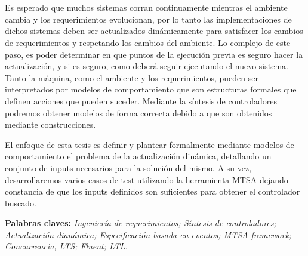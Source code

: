 \chapter*{\runtitulo}

\noindent Es esperado que muchos sistemas corran continuamente mientras el ambiente cambia y los
requerimientos evolucionan, por lo tanto las implementaciones de dichos sistemas deben ser
actualizados dinámicamente para satisfacer los cambios de requerimientos y respetando los cambios
del ambiente. Lo complejo de este paso, es poder determinar en que puntos de la ejecución previa
es seguro hacer la actualización, y si es seguro, como deberá seguir ejecutando el nuevo sistema.
Tanto la máquina, como el ambiente y los requerimientos, pueden ser interpretados por modelos de 
comportamiento que son estructuras formales que definen acciones que pueden suceder. Mediante la
síntesis de controladores podremos obtener modelos de forma correcta debido a que son obtenidos 
mediante construcciones. 

\noindent El enfoque de esta tesis es definir y plantear formalmente mediante modelos 
de comportamiento el problema de la actualización dinámica, detallando un conjunto de inputs 
necesarios para la solución del mismo. A su vez, desarrollaremos varios casos de test utilizando la
herramienta MTSA dejando constancia de que los inputs definidos son suficientes para obtener el
controlador buscado.

 
\bigskip

\noindent\textbf{Palabras claves:} \textit{Ingeniería de requerimientos; Síntesis de controladores;
Actualización dianámica; Especificación basada en eventos; MTSA framework; Concurrencia, LTS;
Fluent; LTL.}
